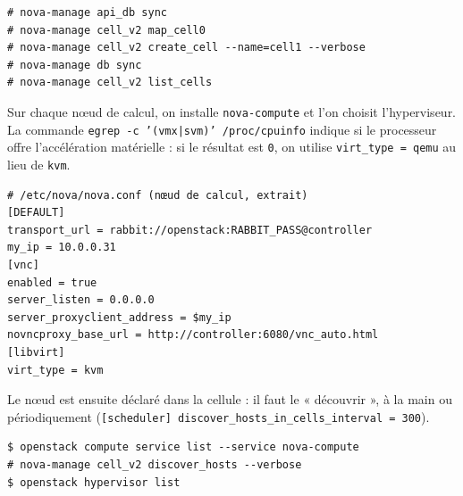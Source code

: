 \par\noindent\begin{minipage}{\linewidth}
\begin{lstlisting}[style=terminal]
# nova-manage api_db sync
# nova-manage cell_v2 map_cell0
# nova-manage cell_v2 create_cell --name=cell1 --verbose
# nova-manage db sync
# nova-manage cell_v2 list_cells
\end{lstlisting}
\end{minipage}\par

Sur chaque nœud de calcul, on installe \texttt{nova-compute} et l'on choisit l'hyperviseur. La commande
\texttt{egrep -c '(vmx|svm)' /proc/cpuinfo} indique si le processeur offre l'accélération matérielle : si le
résultat est \texttt{0}, on utilise \texttt{virt\_type = qemu} au lieu de \texttt{kvm}.

\par\noindent\begin{minipage}{\linewidth}
\begin{lstlisting}
# /etc/nova/nova.conf (nœud de calcul, extrait)
[DEFAULT]
transport_url = rabbit://openstack:RABBIT_PASS@controller
my_ip = 10.0.0.31
[vnc]
enabled = true
server_listen = 0.0.0.0
server_proxyclient_address = $my_ip
novncproxy_base_url = http://controller:6080/vnc_auto.html
[libvirt]
virt_type = kvm
\end{lstlisting}
\end{minipage}\par

Le nœud est ensuite déclaré dans la cellule : il faut le « découvrir », à la main ou périodiquement
(\texttt{[scheduler] discover\_hosts\_in\_cells\_interval = 300}).

\par\noindent\begin{minipage}{\linewidth}
\begin{lstlisting}[style=terminal]
$ openstack compute service list --service nova-compute
# nova-manage cell_v2 discover_hosts --verbose
$ openstack hypervisor list
\end{lstlisting}
\end{minipage}\par

